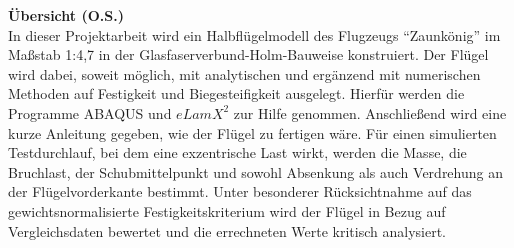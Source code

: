 \noindent\large{\textbf{Übersicht (O.S.)}}~\\

\noindent In dieser Projektarbeit wird ein Halbflügelmodell des Flugzeugs “Zaunkönig” im Maßstab 1:4,7 in der Glasfaserverbund-Holm-Bauweise konstruiert. Der Flügel wird dabei, soweit möglich, mit analytischen und ergänzend mit numerischen Methoden auf Festigkeit und Biegesteifigkeit ausgelegt. Hierfür werden die Programme ABAQUS und $ eLamX^{2} $ zur Hilfe genommen. Anschließend wird eine kurze Anleitung gegeben, wie der Flügel zu fertigen wäre. Für einen simulierten Testdurchlauf, bei dem eine exzentrische Last wirkt, werden die Masse, die Bruchlast, der Schubmittelpunkt und sowohl Absenkung als auch Verdrehung an der Flügelvorderkante bestimmt. Unter besonderer Rücksichtnahme auf das gewichtsnormalisierte Festigkeitskriterium wird der Flügel in Bezug auf Vergleichsdaten bewertet und die errechneten Werte kritisch analysiert.